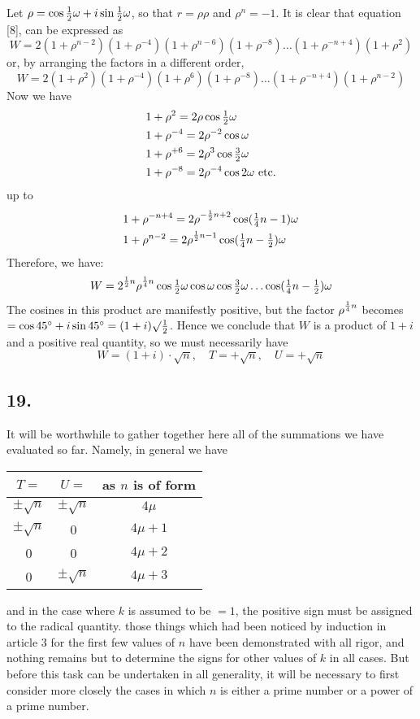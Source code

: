 \documentclass[twoside,12pt]{memoir}
\let\oldfrac\frac
\def\frac#1#2{\mathchoice{\tfrac{#1}{#2}}{\oldfrac{#1}{#2}}{\genfrac{}{}{}{2}{#1}{#2\mathstrut}}{\genfrac{}{}{}{3}{#1}{#2\mathstrut}}}
\begin{document}
Let \(\rho=\cos \frac{1}{2} \omega+i \sin \frac{1}{2} \omega\), so that \(r=\rho \rho\) and \(\rho^{n}=-1\).  It is clear that equation [8], can be expressed as
\[W=2(1+\rho^{n-2})(1+\rho^{-4})(1+\rho^{n-6})(1+\rho^{-8}) \ldots(1+\rho^{-n+4})(1+\rho^{2})\]
or, by arranging the factors in a different order,
\[W=2(1+\rho^{2})(1+\rho^{-4})(1+\rho^{6})(1+\rho^{-8}) \ldots(1+\rho^{-n+4})(1+\rho^{n-2})\]
Now we have
\[\begin{aligned}
& 1+\rho^{2}=2 \rho \cos \frac{1}{2} \omega \\
& 1+\rho^{-4}=2 \rho^{-2} \cos \omega \\
& 1+\rho^{+6}=2 \rho^{3} \cos \frac{3}{2} \omega \\
& 1+\rho^{-8}=2 \rho^{-4} \cos 2 \omega \text{ etc{.}}
\end{aligned}\]
up to
\[\begin{aligned}
& 1+\rho^{-n+4}=2 \rho^{-\frac{1}{2} n+2} \cos (\frac{1}{4} n-1) \omega \\
& 1+\rho^{n-2}=2 \rho^{\frac{1}{2} n-1} \cos (\frac{1}{4} n-\frac{1}{2}) \omega
\end{aligned}\]
Therefore, we have:\pagebreak%
\[W=2^{\frac{1}{2} n} \rho^{\frac{1}{4} n} \cos \frac{1}{2} \omega \cos \omega \cos \frac{3}{2} \omega \ldots \cos (\frac{1}{4} n-\frac{1}{2}) \omega\]
The cosines in this product are manifestly positive, but the factor \(\rho^{\frac{1}{4}n}\) becomes \(=\cos 45^{\circ}+i \sin 45^{\circ}=(1+i) \surd \frac{1}{2}\). Hence we conclude that \(W\) is a product of \(1+i\) and a positive real quantity, so we must necessarily have
\[W=(1+i) \cdot \surd n, \quad T=+\surd n, \quad U=+\surd n\]

\subsection*{19.}

It will be worthwhile to gather together here all of the summations we have evaluated so far. Namely, in general we have
\begin{center}
\begin{tabular}{|c|c|c|}
\hline
\(T=\) & \(U=\) & as \(n\) is of form \\
\hline
\(\pm \surd n\) & \(\pm \surd n\) & \(4 \mu\) \\
\(\pm \surd n\) & 0 & \(4 \mu+1\) \\
0 & 0 & \(4 \mu+2\) \\
0 & \(\pm \surd n\) & \(4 \mu+3\) \\
\hline
\end{tabular}
\end{center}
and in the case where \(k\) is assumed to be \(=1\), the positive sign must be assigned to the radical quantity. those things which had been noticed by induction in article 3 for the first few values of \(n\) have been demonstrated with all rigor, and nothing remains but to determine the signs for other values of \(k\) in all cases. But before this task can be undertaken in all generality, it will be necessary to first consider more closely the cases in which \(n\) is either a prime number or a power of a prime number.
\end{document}
